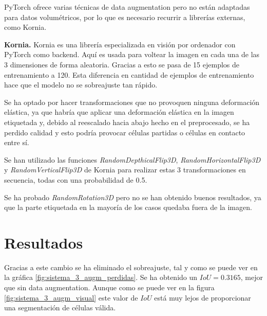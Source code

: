 PyTorch ofrece varias técnicas de data augmentation pero no están adaptadas para datos volumétricos, por lo que es necesario recurrir a librerías externas, como Kornia.

\textbf{Kornia.} Kornia \cite{ERiba2020} es una librería especializada en visión por ordenador con PyTorch como backend. Aquí es usada para voltear la imagen en cada una de las 3 dimensiones de forma aleatoria. Gracias a esto se pasa de 15 ejemplos de entrenamiento a 120. Esta diferencia en cantidad de ejemplos de entrenamiento hace que el modelo no se sobreajuste tan rápido.

Se ha optado por hacer transformaciones que no provoquen ninguna deformación elástica, ya que habría que aplicar una deformación elástica en la imagen etiquetada y, debido al reescalado hacia abajo hecho en el preprocesado, se ha perdido calidad y esto podría provocar células partidas o células en contacto entre sí.

Se han utilizado las funciones \textit{RandomDepthicalFlip3D}, \textit{RandomHorizontalFlip3D} y \textit{RandomVerticalFlip3D} de Kornia para realizar estas 3 transformaciones en secuencia, todas con una probabilidad de 0.5.

Se ha probado \textit{RandomRotation3D} pero no se han obtenido buenos resultados, ya que la parte etiquetada en la mayoría de los casos quedaba fuera de la imagen.

\section{Resultados}\label{sec:data_augmentation_resultados}




Gracias a este cambio se ha eliminado el sobreajuste, tal y como se puede ver en la gráfica \ref{fig:sistema_3_augm_perdidas}. Se ha obtenido un $IoU=0.3165$, mejor que sin data augmentation. Aunque como se puede ver en la figura \ref{fig:sistema_3_augm_visual} este valor de $IoU$ está muy lejos de proporcionar una segmentación de células válida.